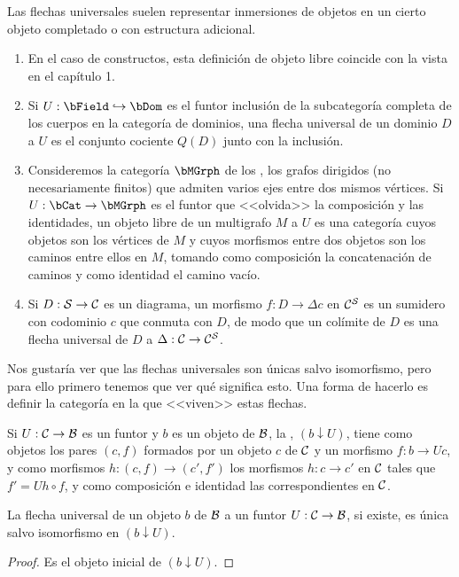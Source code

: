 \begin{example}
  Las flechas universales suelen representar inmersiones de objetos en un
  cierto objeto completado o con estructura adicional.
  \begin{enumerate}
  \item En el caso de constructos, esta definición de objeto libre coincide con
    la vista en el capítulo 1.
  \item Si $U:\bField\inTo\bDom$ es el funtor inclusión de la subcategoría
    completa de los cuerpos en la categoría de dominios, una flecha universal de
    un dominio $D$ a $U$ es el conjunto cociente $Q(D)$ junto con la inclusión.
  \item Consideremos la categoría $\bMGrph$ de los , los
    grafos dirigidos (no necesariamente finitos) que admiten varios ejes entre
    dos mismos vértices. Si $U:\bCat\to\bMGrph$ es el funtor que <<olvida>> la
    composición y las identidades, un objeto libre de un multigrafo $M$ a $U$ es
    una categoría cuyos objetos son los vértices de $M$ y cuyos morfismos entre
    dos objetos son los caminos entre ellos en $M$, tomando como composición la
    concatenación de caminos y como identidad el camino vacío.
  \item Si $D:\mathcal{S}\to\mathcal{C}$ es un diagrama, un morfismo $f:D\to\Delta c$ en
    $\mathcal{C}^{\mathcal{S}}$ es un sumidero con codominio $c$ que conmuta con $D$, de modo que
    un colímite de $D$ es una flecha universal de $D$ a $\Delta:\mathcal{C}\to\mathcal{C}^{\mathcal{S}}$.
  \end{enumerate}
\end{example}

Nos gustaría ver que las flechas universales son únicas salvo isomorfismo, pero
para ello primero tenemos que ver qué significa esto. Una forma de hacerlo es
definir la categoría en la que <<viven>> estas flechas.

\begin{definition}
  Si $U:\mathcal{C}\to\mathcal{B}$ es un funtor y $b$ es un objeto de $\mathcal{B}$, la , $(b\downarrow U)$, tiene como objetos los pares
  $(c,f)$ formados por un objeto $c$ de $\mathcal{C}$ y un morfismo $f:b\to Uc$, y como
  morfismos $h:(c,f)\to(c',f')$ los morfismos $h:c\to c'$ en $\mathcal{C}$ tales que
  $f'=Uh\circ f$, y como composición e identidad las correspondientes en $\mathcal{C}$.
\end{definition}

\begin{proposition}
  La flecha universal de un objeto $b$ de $\mathcal{B}$ a un funtor $U:\mathcal{C}\to\mathcal{B}$, si
  existe, es única salvo isomorfismo en $(b\downarrow U)$.
\end{proposition}
\begin{proof}
  Es el objeto inicial de $(b\downarrow U)$.
\end{proof}

